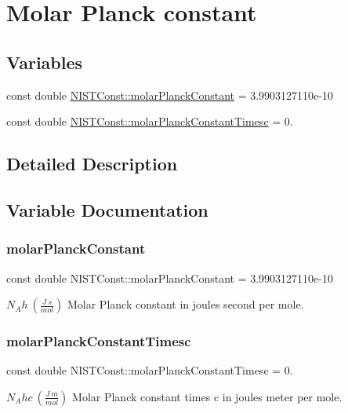 \hypertarget{group___molar_planck_constant}{}\section{Molar Planck constant}
\label{group___molar_planck_constant}
\subsection*{Variables}
\begin{DoxyCompactItemize}
\item 
const double \hyperlink{group___molar_planck_constant_gaf75c23aa4c9305b0670bc8162fa25b66}{N\+I\+S\+T\+Const\+::molar\+Planck\+Constant} = 3.\+9903127110e-\/10
\item 
const double \hyperlink{group___molar_planck_constant_ga4ead25403deaa41d6f95b1252140b8b0}{N\+I\+S\+T\+Const\+::molar\+Planck\+Constant\+Timesc} = 0.
\end{DoxyCompactItemize}


\subsection{Detailed Description}


\subsection{Variable Documentation}
\mbox{\label{group___molar_planck_constant_gaf75c23aa4c9305b0670bc8162fa25b66}} 
\subsubsection{\texorpdfstring{molar\+Planck\+Constant}{molarPlanckConstant}}
{\footnotesize\ttfamily const double N\+I\+S\+T\+Const\+::molar\+Planck\+Constant = 3.\+9903127110e-\/10}

$N_A h \ (\frac{J\ s}{mol})$ Molar Planck constant in joules second per mole. \mbox{\label{group___molar_planck_constant_ga4ead25403deaa41d6f95b1252140b8b0}} 
\subsubsection{\texorpdfstring{molar\+Planck\+Constant\+Timesc}{molarPlanckConstantTimesc}}
{\footnotesize\ttfamily const double N\+I\+S\+T\+Const\+::molar\+Planck\+Constant\+Timesc = 0.}

$N_A hc \ (\frac{J\ m}{mol})$ Molar Planck constant times c in joules meter per mole. 